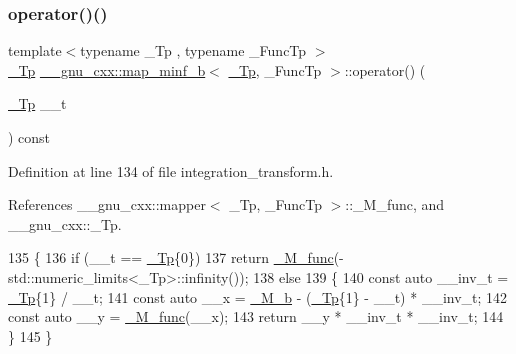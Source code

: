 \subsubsection{\texorpdfstring{operator()()}{operator()()}}
{\footnotesize\ttfamily template$<$typename \+\_\+\+Tp , typename \+\_\+\+Func\+Tp $>$ \\
\hyperlink{namespace____gnu__cxx_a3b19a9c800ca194374ef9172290f7d79}{\+\_\+\+Tp} \hyperlink{struct____gnu__cxx_1_1map__minf__b}{\+\_\+\+\_\+gnu\+\_\+cxx\+::map\+\_\+minf\+\_\+b}$<$ \hyperlink{namespace____gnu__cxx_a3b19a9c800ca194374ef9172290f7d79}{\+\_\+\+Tp}, \+\_\+\+Func\+Tp $>$\+::operator() (\begin{DoxyParamCaption}\item[{\hyperlink{namespace____gnu__cxx_a3b19a9c800ca194374ef9172290f7d79}{\+\_\+\+Tp}}]{\+\_\+\+\_\+t }\end{DoxyParamCaption}) const\hspace{0.3cm}{\ttfamily [inline]}}



Definition at line 134 of file integration\+\_\+transform.\+h.



References \+\_\+\+\_\+gnu\+\_\+cxx\+::mapper$<$ \+\_\+\+Tp, \+\_\+\+Func\+Tp $>$\+::\+\_\+\+M\+\_\+func, and \+\_\+\+\_\+gnu\+\_\+cxx\+::\+\_\+\+Tp.


\begin{DoxyCode}
135       \{
136         \textcolor{keywordflow}{if} (\_\_t == \hyperlink{namespace____gnu__cxx_a3b19a9c800ca194374ef9172290f7d79}{\_Tp}\{0\})
137           \textcolor{keywordflow}{return} \hyperlink{struct____gnu__cxx_1_1map__minf__b_a6eeb7b723b6bb691690adfbdec7b4648}{\_M\_func}(-std::numeric\_limits<\_Tp>::infinity());
138         \textcolor{keywordflow}{else}
139           \{
140             \textcolor{keyword}{const} \textcolor{keyword}{auto} \_\_inv\_t = \hyperlink{namespace____gnu__cxx_a3b19a9c800ca194374ef9172290f7d79}{\_Tp}\{1\} / \_\_t;
141             \textcolor{keyword}{const} \textcolor{keyword}{auto} \_\_x = \hyperlink{struct____gnu__cxx_1_1map__minf__b_a03b2c7b30f21200812f87251cd0aff66}{\_M\_b} - (\hyperlink{namespace____gnu__cxx_a3b19a9c800ca194374ef9172290f7d79}{\_Tp}\{1\} - \_\_t) * \_\_inv\_t;
142             \textcolor{keyword}{const} \textcolor{keyword}{auto} \_\_y = \hyperlink{struct____gnu__cxx_1_1map__minf__b_a6eeb7b723b6bb691690adfbdec7b4648}{\_M\_func}(\_\_x);
143             \textcolor{keywordflow}{return} \_\_y * \_\_inv\_t * \_\_inv\_t;
144           \}
145       \}
\end{DoxyCode}


